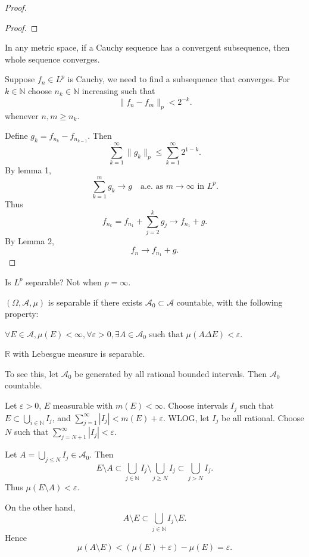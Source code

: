 \begin{proof}
\begin{proof}
	\end{proof}
	\begin{lemma}
		In any metric space, if a Cauchy sequence has a convergent subsequence, then whole sequence converges.
	\end{lemma}

	Suppose $f_n \in L^p$ is Cauchy, we need to find a subsequence that converges. For $k \in \mathbb{N}$ choose $n_k \in \mathbb{N}$ increasing such that
	\[
		\|f_n - f_m\|_p < 2^{-k}
	.\] 
	whenever $n, m \ge  n_k$.

	Define $g_k = f_{n_k} - f_{n_{k-1}}$. Then
	\[
		\sum_{k=1}^{\infty} \|g_k\|_p \le \sum_{k=1}^{\infty} 2^{1-k}
	.\] 
	By lemma 1, 
	\[
		\sum_{k=1}^{m} g_k \to  g \quad \text{a.e. as }m\to \infty  \text{ in }L^p
	.\] 
	Thus
	\[
		f_{n_k} = f_{n_1} + \sum_{j=2}^{k} g_j \to  f_{n_1} + g
	.\] 
	By Lemma 2,
	\[
		f_n \to f_{n_1} + g
	.\] 


	
\end{proof}

Is $L^p$ separable? Not when $p = \infty$. 

\begin{definition}
	$(\Omega, \mathcal{A}, \mu)$ is separable if there exists $\mathcal{A}_0 \subset \mathcal{A}$ countable, with the following property:

	$\forall  E \in \mathcal{A}, \mu(E) < \infty , \forall  \varepsilon>0, \exists A \in \mathcal{A}_0$ such that $\mu(A \Delta E) < \varepsilon$.
\end{definition}

\begin{example}
	$\mathbb{R}$ with Lebesgue measure is separable.

	To see this, let $\mathcal{A}_0$ be generated by all rational bounded intervals. Then $\mathcal{A}_0$ countable.

	Let $\varepsilon>0$, $E$ measurable with $m(E) < \infty $. Choose intervals $I_j$ such that $E \subset \bigcup_{i \in \mathbb{N}} I_j$, and $\sum_{j=1}^{\infty} |I_j| < m(E) + \varepsilon$. WLOG, let $I_j$ be all rational. Choose $N$ such that $\sum_{j=N+1}^{\infty} |I_j| < \varepsilon $.

	Let $A = \bigcup_{j \le N} I_j \in \mathcal{A}_0$.  Then
	\[
		E \setminus A \subset \bigcup_{j \in \mathbb{N}}  I_j \setminus  \bigcup_{j \ge N} I_j
		\subset \bigcup_{j > N} I_j
	.\] 
	Thus $\mu(E \setminus A) < \varepsilon$.

	On the other hand,
	\[
		A \setminus E \subset \bigcup_{j \in \mathbb{N}} I_j \setminus E
	.\] 
	Hence 
	\[
		\mu(A \setminus E)
		< (\mu(E) + \varepsilon) - \mu(E) = \varepsilon
	.\] 
\end{example}

